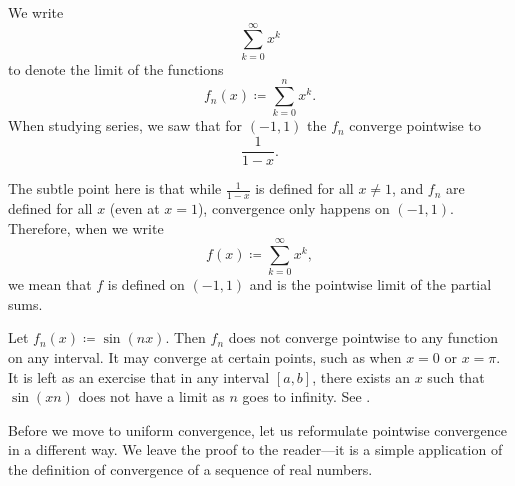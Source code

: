 \begin{example} \label{example:geomsumptconv}
We write
\begin{equation*}
\sum_{k=0}^\infty x^k
\end{equation*}
to denote the limit of the functions
\begin{equation*}
f_n(x) \coloneqq \sum_{k=0}^n x^k .
\end{equation*}
When studying series, 
we saw that for $(-1,1)$ the $f_n$ converge pointwise to
\begin{equation*}
\frac{1}{1-x} .
\end{equation*}

The subtle point here is that while
$\frac{1}{1-x}$ is defined for all $x \neq 1$, and $f_n$ are 
defined for all $x$ (even at $x=1$), convergence only happens on $(-1,1)$.
Therefore, when we write
\begin{equation*}
f(x) \coloneqq \sum_{k=0}^\infty x^k ,
\end{equation*}
we mean that $f$ is defined on $(-1,1)$ and is the pointwise limit
of the partial sums.
\end{example}

\begin{example}
Let $f_n(x) \coloneqq \sin(nx)$.  Then $f_n$ does not converge pointwise
to any function on any interval.  It may converge at certain points, such
as when $x=0$ or $x=\pi$.  It is left as an exercise that in any interval
$[a,b]$, there exists an $x$ such that $\sin(xn)$ does not have a limit
as $n$ goes to infinity.  See .
\begin{myfigureht}
\caption{Graphs of $\sin(nx)$ for
$n=1,2,\ldots,10$, with higher $n$ in fainter gray.%
\label{fig:nonconvsinxn}}
\end{myfigureht}
\end{example}

Before we move to uniform convergence, let us reformulate pointwise
convergence in a different way.
We leave the proof to the reader---it is a simple application of the
definition of convergence of a sequence of real numbers.

